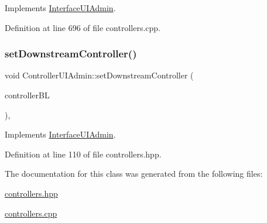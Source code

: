Implements \hyperlink{class_interface_u_i_admin_a93530a289e1c659eaa12a8261f4d304e}{Interface\+U\+I\+Admin}.



Definition at line 696 of file controllers.\+cpp.

\mbox{\label{class_controller_u_i_admin_aad33fe10f31f698f1bf0343aa5b2b7ec}} 
\subsubsection{\texorpdfstring{set\+Downstream\+Controller()}{setDownstreamController()}}
{\footnotesize\ttfamily void Controller\+U\+I\+Admin\+::set\+Downstream\+Controller (\begin{DoxyParamCaption}\item[{\hyperlink{class_interface_b_l_admin}{Interface\+B\+L\+Admin} $\ast$}]{controller\+BL }\end{DoxyParamCaption})\hspace{0.3cm}{\ttfamily [inline]}, {\ttfamily [virtual]}}



Implements \hyperlink{class_interface_u_i_admin_a4c663ca0610288ba4ac5b8f772454cfc}{Interface\+U\+I\+Admin}.



Definition at line 110 of file controllers.\+hpp.



The documentation for this class was generated from the following files\+:\begin{DoxyCompactItemize}
\item 
\hyperlink{controllers_8hpp}{controllers.\+hpp}\item 
\hyperlink{controllers_8cpp}{controllers.\+cpp}\end{DoxyCompactItemize}
